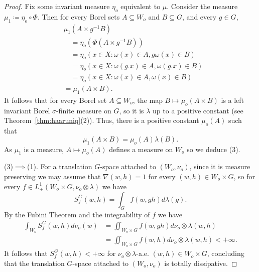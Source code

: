 \documentclass{amsart}
\numberwithin{equation}{subsection}
\begin{document}
\begin{proof}
Fix some invariant measure \(\eta_{o}\) equivalent to \(\mu\). Consider the measure \(\mu_{1}\coloneqq \eta_{o}\circ\Phi\). Then for every Borel sets \(A\subseteq W_{o}\) and \(B\subseteq G\), and every \(g\in G\),
\begin{align*}
&\mu_{1}\left(A\times g^{-1}B\right)\\
&\quad=\eta_{o}\left(\Phi\left(A\times g^{-1}B\right)\right)\\
&\quad=\eta_{o}\left(x\in X:\omega\left(x\right)\in A,g\omega\left(x\right)\in B\right)\\
&\quad=\eta_{o}\left(x\in X:\omega\left(g.x\right)\in A,\omega\left(g.x\right)\in B\right)\\
&\quad=\eta_{o}\left(x\in X:\omega\left(x\right)\in A,\omega\left(x\right)\in B\right)\\
&=\mu_{1}\left(A\times B\right).
\end{align*}
It follows that for every Borel set \(A\subseteq W_{o}\), the map \(B\mapsto\mu_{o}\left(A\times B\right)\) is a left invariant Borel \(\sigma\)-finite measure on \(G\), so it is \(\lambda\) up to a positive constant (see Theorem~\ref{thm:haaruniq}(2)). Thus, there is a positive constant \(\mu_{o}\left(A\right)\) such that
\[\mu_{1}\left(A\times B\right)=\mu_{o}\left(A\right)\lambda\left(B\right).\]
As \(\mu_{1}\) is a measure, \(A\mapsto\mu_{o}\left(A\right)\) defines a measure on \(W_{o}\) so we deduce (3).

(3)\(\implies\)(1). For a translation \(G\)-space attached to \(\left(W_{o},\nu_{o}\right)\), since it is measure preserving we may assume that \(\nabla\left(w,h\right)=1\) for every \(\left(w,h\right)\in W_{o}\times G\), so for every \(f\in L_{+}^{1}\left(W_{o}\times G,\nu_{o}\otimes\lambda\right)\) we have
\[S_{f}^{G}\left(w,h\right)=\int_{G}f\left(w,gh\right)d\lambda\left(g\right).\]
By the Fubini Theorem and the integrability of \(f\) we have
\begin{align*}
\int_{W_{o}}S_{f}^{G}\left(w,h\right)d\nu_{o}\left(w\right)	
&=\iint\nolimits_{W_{o}\times G}f\left(w,gh\right)d\nu_{o}\otimes\lambda\left(w,h\right)\\
&=\iint\nolimits_{W_{o}\times G}f\left(w,h\right)d\nu_{o}\otimes\lambda\left(w,h\right)<+\infty.
\end{align*}
It follows that \(S_{f}^{G}\left(w,h\right)<+\infty\) for \(\nu_{o}\otimes\lambda\)-a.e. \(\left(w,h\right)\in W_{o}\times G\), concluding that the translation \(G\)-space attached to \(\left(W_{o},\nu_{o}\right)\) is totally dissipative.
\end{proof}
\end{document}
